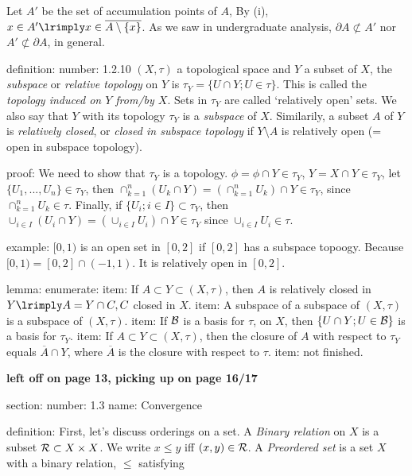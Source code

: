         Let $A'$ be the set of accumulation points of $A$, By (i), $x \in A' \lrimply x \in \overline{ A \setminus \{ x \}}$. As we saw in undergraduate analysis, $\partial A \not \subset A'$ nor $A' \not \subset \partial A$, in general.


    definition:
        number:
            1.2.10
        $(X, \tau)$ a topological space and $Y$ a subset of $X$, the \emph{subspace} or \emph{relative topology} on $Y$ is $\tau_Y = \{ U \cap Y; U \in \tau \}$. This is called the \emph{topology induced on $Y$ from/by $X$}. Sets in $\tau_Y$ are called `relatively open' sets. We also say that $Y$ with its topology $\tau_Y$ is a \emph{subspace} of $X$. Similarily, a subset $A$ of $Y$ is \emph{relatively closed}, or \emph{closed in subspace topology} if $Y \setminus A$ is relatively open (= open in subspace topology).
    
        proof:
            We need to show that $\tau_Y$ is a topology. $\phi = \phi \cap Y \in \tau_Y$, $Y = X \cap Y \in \tau_Y$, let $\{ U_1, ..., U_n \} \in \tau_Y$, then $\cap_{k=1}^n (U_k \cap Y) = \left( \cap_{k=1}^n U_k \right) \cap Y \in \tau_Y$, since $\cap_{k=1}^n U_k \in \tau$. Finally, if $\{ U_i; i \in I \} \subset \tau_Y$, then $\cup_{i \in I} ( U_i \cap Y) = \left( \cup_{i \in I} U_i \right) \cap Y \in \tau_Y$ since $\cup_{i \in I} U_i \in \tau$.
    
    example:
        $[0,1)$ is an open set in $[0,2]$ if $[0,2]$ has a subspace topoogy. Because $[0,1) = [0,2] \cap (-1,1)$. It is relatively open in $[0,2]$. 
    

    lemma:
        enumerate:
            item:
                If $A \subset Y \subset (X, \tau)$, then $A$ is relatively closed in $Y \lrimply A = Y \cap C, C$ closed in $X$.
            item:
                A subspace of a subspace of $(X, \tau)$ is a subspace of $(X, \tau)$.
            item:
                If $\mathcal{B}$ is a basis for $\tau$, on $X$, then $\{ U \cap Y; U \in \mathcal{B} \}$ is a basis for $\tau_Y$.
            item:
                If $A \subset Y \subset (X, \tau)$, then the closure of $A$ with respect to $\tau_Y$ equals $\overline{A} \cap Y$, where $\overline{A}$ is the closure with respect to $\tau$. 
            item:
                not finished.



    {\bf left off on page 13, picking up on page 16/17}
    
    section:
        number:
            1.3
        name:
            Convergence
    
    
    definition:
    First, let's discuss orderings on a set. A \emph{Binary relation} on $X$ is a subset $\mathcal{R} \subset X \times X$. We write $x \le y$ iff $(x,y) \in \mathcal{R}$. A \emph{Preordered set} is a set $X$ with a binary relation, $\le$ satisfying
    
